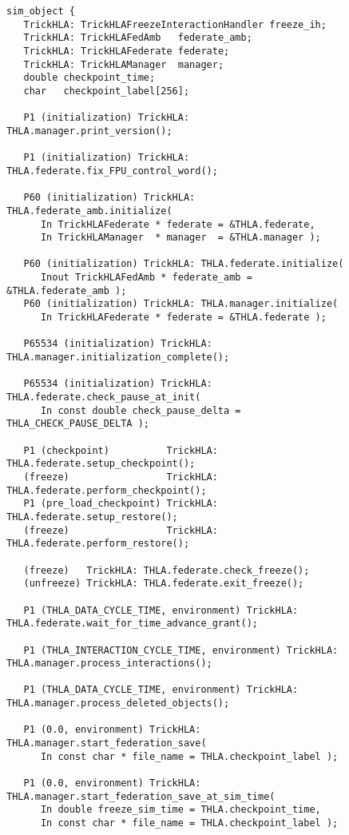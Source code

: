 \begin{figure}[th]
  \begin{center}
    \scriptsize
    \begin{verbatim}
sim_object {
   TrickHLA: TrickHLAFreezeInteractionHandler freeze_ih;
   TrickHLA: TrickHLAFedAmb   federate_amb;
   TrickHLA: TrickHLAFederate federate;
   TrickHLA: TrickHLAManager  manager;
   double checkpoint_time;
   char   checkpoint_label[256];

   P1 (initialization) TrickHLA: THLA.manager.print_version();

   P1 (initialization) TrickHLA: THLA.federate.fix_FPU_control_word();

   P60 (initialization) TrickHLA: THLA.federate_amb.initialize(
      In TrickHLAFederate * federate = &THLA.federate,
      In TrickHLAManager  * manager  = &THLA.manager );

   P60 (initialization) TrickHLA: THLA.federate.initialize(
      Inout TrickHLAFedAmb * federate_amb = &THLA.federate_amb );
   P60 (initialization) TrickHLA: THLA.manager.initialize(
      In TrickHLAFederate * federate = &THLA.federate );

   P65534 (initialization) TrickHLA: THLA.manager.initialization_complete();

   P65534 (initialization) TrickHLA: THLA.federate.check_pause_at_init( 
      In const double check_pause_delta = THLA_CHECK_PAUSE_DELTA );

   P1 (checkpoint)          TrickHLA: THLA.federate.setup_checkpoint();
   (freeze)                 TrickHLA: THLA.federate.perform_checkpoint();
   P1 (pre_load_checkpoint) TrickHLA: THLA.federate.setup_restore();
   (freeze)                 TrickHLA: THLA.federate.perform_restore();

   (freeze)   TrickHLA: THLA.federate.check_freeze();
   (unfreeze) TrickHLA: THLA.federate.exit_freeze();

   P1 (THLA_DATA_CYCLE_TIME, environment) TrickHLA: THLA.federate.wait_for_time_advance_grant();

   P1 (THLA_INTERACTION_CYCLE_TIME, environment) TrickHLA: THLA.manager.process_interactions();

   P1 (THLA_DATA_CYCLE_TIME, environment) TrickHLA: THLA.manager.process_deleted_objects();

   P1 (0.0, environment) TrickHLA: THLA.manager.start_federation_save(
      In const char * file_name = THLA.checkpoint_label );

   P1 (0.0, environment) TrickHLA: THLA.manager.start_federation_save_at_sim_time(
      In double freeze_sim_time = THLA.checkpoint_time,
      In const char * file_name = THLA.checkpoint_label );


\end{verbatim}
\end{center}
\end{figure}
